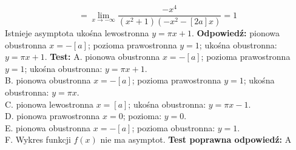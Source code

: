 \documentclass[12pt, a4paper]{article}
\theoremstyle{definition} %
\newcommand{\rozwStop}{\newline}                                            %
\newcommand{\odpStart}{\noindent \textbf{Odpowiedź:}\newline}    %
\newcommand{\odpStop}{\newline}                                             %
\newcommand{\testStart}{\noindent \textbf{Test:}\newline} %
\newcommand{\testStop}{\newline} %
\newcommand{\kluczStart}{\noindent \textbf{Test poprawna odpowiedź:}\newline} %
\newcommand{\kluczStop}{\newline} %
\begin{document}
$$=\lim_{x\to-\infty}\frac{-x^{4}}{(x^{2}+1)(-x^{2}-[2a]x)}=1$$
Istnieje asymptota ukośna lewostronna $y=\pi x+1$.
\rozwStop
\odpStart
pionowa obustronna $x=-[a]$; pozioma prawostronna $y=1$; ukośna obustronna: $y=\pi x+1$.
\odpStop
\testStart
A. pionowa obustronna $x=-[a]$; pozioma prawostronna $y=1$; ukośna obustronna: $y=\pi x+1$.\\
B. pionowa obustronna $x=-[a]$; pozioma prawostronna $y=1$; ukośna obustronna: $y=\pi x$.\\
C. pionowa lewostronna $x=[a]$; ukośna obustronna: $y=\pi x-1$.\\
D. pionowa prawostronna $x=0$; pozioma: $y=0$.\\
E. pionowa obustronna $x=-[a]$; pozioma obustronna: $y=1$.\\
F. Wykres funkcji $f(x)$ nie ma asymptot.
\testStop
\kluczStart
A
\kluczStop
\end{document}
